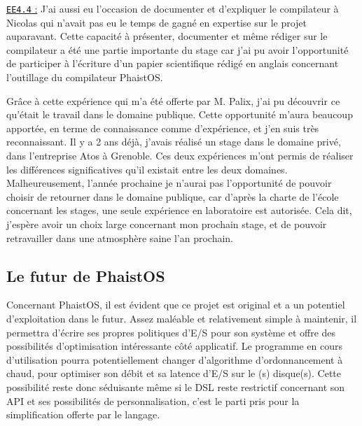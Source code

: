 \underline{\texttt{EE4.4} :} J'ai aussi eu l'occasion de documenter et 
d'expliquer le compilateur à Nicolas qui n'avait pas eu le temps de gagné en 
expertise sur le projet auparavant. Cette capacité à présenter, documenter et 
même rédiger sur le compilateur a été une partie importante du stage car j'ai 
pu avoir l'opportunité de participer à l'écriture d'un papier scientifique 
rédigé en anglais concernant l'outillage du compilateur PhaistOS.

Grâce à cette expérience qui m'a été offerte par M. Palix, j'ai pu découvrir ce 
qu'était le travail dans le domaine publique. Cette opportunité m'aura beaucoup 
apportée, en terme de connaissance comme d'expérience, et j'en suis très 
reconnaissant. Il y a 2 ans déjà, j'avais réalisé un stage dans le domaine 
privé, dans l'entreprise Atos à Grenoble. Ces deux expériences m'ont permis de 
réaliser les différences significatives qu'il existait entre les deux domaines. 
Malheureusement, l'année prochaine je n'aurai pas l'opportunité de pouvoir 
choisir de retourner dans le domaine publique, car d'après la charte de l'école 
concernant les stages, une seule expérience en laboratoire est autorisée. Cela 
dit, j'espère avoir un choix large concernant mon prochain stage, et de pouvoir 
retravailler dans une atmosphère saine l'an prochain.

\subsection{Le futur de PhaistOS}

Concernant PhaistOS, il est évident que ce projet est original et a un 
potentiel d'exploitation dans le futur. Assez maléable et relativement simple à 
maintenir, il permettra d'écrire ses propres politiques d'E/S pour son système 
et offre des possibilités d'optimisation intéressante côté applicatif. Le 
programme en cours d'utilisation pourra potentiellement changer d'algorithme 
d'ordonnancement à chaud, pour optimiser son débit et sa latence d'E/S sur le
(s) disque(s). Cette possibilité reste donc séduisante même si le DSL reste 
restrictif concernant son API et ses possibilités de personnalisation, c'est le 
parti pris pour la simplification offerte par le langage.
